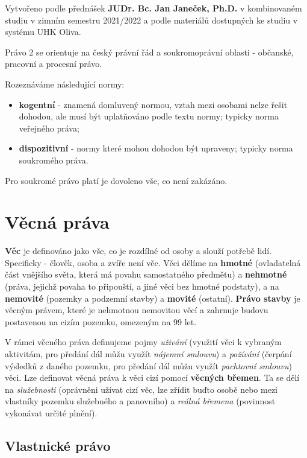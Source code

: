 \epigraph{Vytvořeno podle přednášek \textbf{JUDr. Bc. Jan Janeček, Ph.D.} v kombinovaném studiu v zimním semestru 2021/2022 a podle materiálů dostupných ke studiu v systému UHK Oliva.}{}

Právo 2 se orientuje na český právní řád a soukromoprávní oblasti - občanské, pracovní a procesní právo.

Rozeznáváme následující normy:

\begin{itemize}
\item \textbf{kogentní} - znamená domluvený normou, vztah mezi osobami nelze řešit dohodou, ale musí být uplatňováno podle textu normy; typicky norma veřejného práva;
\item \textbf{dispozitivní} - normy které mohou dohodou být upraveny; typicky norma soukromého práva.
\end{itemize}

Pro soukromé právo platí je dovoleno vše, co není zakázáno.

\section{Věcná práva}

\textbf{Věc} je definováno jako vše, co je rozdílné od osoby a slouží potřebě lidí. Specificky - člověk, osoba a zvíře není věc. Věci dělíme na \textbf{hmotné} (ovladatelná část vnějšího světa, která má povahu samostatného předmětu) a \textbf{nehmotné} (práva, jejichž povaha to připouští, a jiné věci bez hmotné podstaty), a na \textbf{nemovité} (pozemky a podzemní stavby) a \textbf{movité} (ostatní). \textbf{Právo stavby} je věcným právem, které je nehmotnou nemovitou věcí a zahrnuje budovu postavenou na cizím pozemku, omezeným na 99 let.

V rámci věcného práva definujeme pojmy \textit{uživání} (využití věci k vybraným aktivitám, pro předání dál můžu využít \textit{nájemní smlouvu}) a \textit{požívání} (čerpání výsledků z daného pozemku, pro předání dál můžu využít \textit{pachtovní smlouvu}) věci. Lze definovat věcná práva k věci cizí pomocí \textbf{věcných břemen}. Ta se dělí na \textit{služebnosti} (oprávněni užívat cizí věc, lze zřídit buďto osobě nebo mezi vlastníky pozemku služebného a panovního) a \textit{reálná břemena} (povinnost vykonávat určité plnění).

\subsection{Vlastnické právo}


